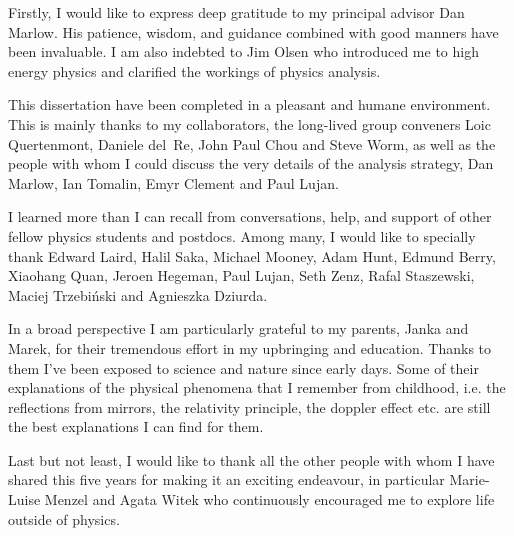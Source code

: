 
Firstly, I would like to express deep gratitude to my principal advisor Dan Marlow. His patience,
wisdom, and guidance combined with good manners have been invaluable. 
I am also indebted to Jim Olsen who introduced me to high energy physics and clarified the workings
of physics analysis.


This dissertation have been completed in a pleasant and humane environment. This is mainly
thanks to my collaborators, the
long-lived group conveners Loic Quertenmont, Daniele del~Re, John Paul Chou and Steve Worm,
as well as the people with whom I could discuss the very details of the analysis strategy,
Dan Marlow, Ian Tomalin, Emyr Clement and Paul Lujan.

I learned more than I can recall from conversations, help, and support of other fellow
physics students and postdocs. Among many, I would like to specially thank Edward Laird, Halil Saka,
Michael Mooney, Adam Hunt, Edmund Berry, Xiaohang Quan, Jeroen Hegeman, Paul Lujan, Seth Zenz,
Rafal Staszewski, Maciej Trzebi\'nski and Agnieszka Dziurda. 

In a broad perspective I am particularly grateful to my parents, Janka and Marek, for their tremendous effort in my upbringing and education.
 Thanks to them I've been exposed to science and nature since early
days. Some of their explanations of the physical phenomena that I remember from childhood,
i.e. the reflections from mirrors, the relativity principle, the doppler effect etc.
are still the best explanations I can find for them.

Last but not least, I would like to thank all the other people with whom I have shared 
this five years for making it an exciting endeavour, in particular Marie-Luise Menzel and Agata
Witek who continuously encouraged me to explore
life outside of physics.
